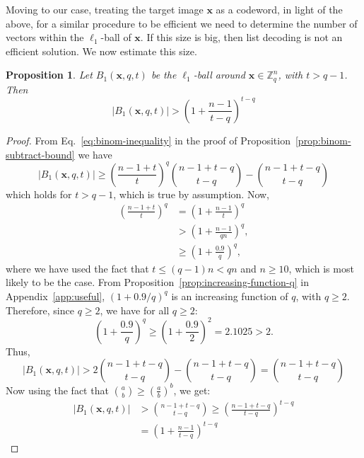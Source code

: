 \documentclass[pdflatex,sn-mathphys-num]{sn-jnl}
\newtheorem{proposition}{Proposition}
\theoremstyle{definition}
\newcommand{\vtr}[1]{\mathbf{#1}}
\begin{document}
Moving to our case, treating the target image $\vtr{x}$ as a codeword, in light of the above, for a similar procedure to be efficient we need to determine the number of vectors within the $\ell_1$-ball of $\vtr{x}$. If this size is big, then list decoding is not an efficient solution. We now estimate this size.
\begin{proposition}
\label{prop:l1-ball-too-big}
Let $B_1(\vtr{x}, q, t)$ be the $\ell_1$-ball around $\vtr{x} \in \mathbb{Z}_q^n$, with $t > q - 1$. Then 
\begin{equation}
\label{eq:l1-ball-size}
    |B_1(\vtr{x}, q, t)| > \left(1 + \frac{n-1}{t-q}\right)^{t-q}
\end{equation}
\end{proposition}
\begin{proof}
From Eq.~\ref{eq:binom-inequality} in the proof of Proposition~\ref{prop:binom-subtract-bound} we have
\[
    |B_1(\vtr{x}, q, t)| \geq \left( \frac{n-1+t}{t}\right)^q \binom{n -1 + t - q}{t-q} - \binom{n -1 + t - q}{t-q}
\]
which holds for $t > q-1$, which is true by assumption. %
Now,
\begin{align*}
    \left( \frac{n-1+t}{t}\right)^q &= \left( 1 + \frac{n-1}{t}\right)^q \\
    &> \left( 1 + \frac{n-1}{qn}\right)^q,\\
    &\geq \left( 1 + \frac{0.9}{q}\right)^q,
\end{align*}
where we have used the fact that $t \leq (q-1)n < qn$ and $n \geq 10$, which is most likely to be the case. From Proposition~\ref{prop:increasing-function-q} in Appendix~\ref{app:useful}, $(1 + 0.9/q)^q$ is an increasing function of $q$, with $q \geq 2$. Therefore, since $q \geq 2$, we have for all $q \geq 2$:
\[
\left( 1 + \frac{0.9}{q}\right)^q \geq \left( 1 + \frac{0.9}{2}\right)^2  = 2.1025 > 2.
\]
Thus,
\[
    |B_1(\vtr{x}, q, t)| > 2 \binom{n -1 + t - q}{t-q} - \binom{n -1 + t - q}{t-q} = \binom{n -1 + t - q}{t-q}
\]
Now using the fact that $\binom{a}{b} \geq \left(\frac{a}{b}\right)^b$, we get:
\begin{align*}
        |B_1(\vtr{x}, q, t)| &> \binom{n -1 + t - q}{t-q} \geq \left( \frac{n -1 + t - q}{t-q} \right)^{t-q} \\
        &= \left(1 + \frac{n-1}{t-q}\right)^{t-q}
\end{align*}
\end{proof}
\end{document}
